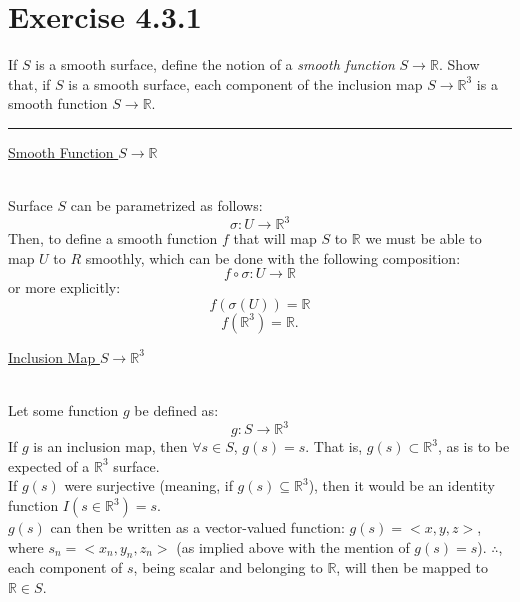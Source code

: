 \documentclass[12pt]{article}
\newcommand{\ulind}[1]
{
\noindent
\underline{#1}\\\\
\indent
}
\newcommand{\R}
{
\mathbb{R}
}
\begin{document}
\maketitle

\section*{Exercise 4.3.1}
\indent

If $S$ is a smooth surface, define the notion of a \emph{smooth function} $S\rightarrow\R$. Show that, if $S$ is a smooth surface, each component of the inclusion map $S\rightarrow\R^3$ is a smooth function $S\rightarrow\R$.

\vspace{1cm}
\hrule
\vspace{1cm}
\noindent

\ulind{Smooth Function $S\rightarrow\R$}
Surface $S$ can be parametrized as follows:
$$
\sigma : U \rightarrow \R^3
$$
Then, to define a smooth function $f$ that will map $S$ to $\R$ we must be able to map $U$ to $R$ smoothly, which can be done with the following composition:
$$
f \circ \sigma : U \rightarrow \R
$$
or more explicitly:
$$
f(\sigma(U)) = \R
$$
$$
f(\R^3) = \R.
$$

\ulind{Inclusion Map $S\rightarrow\R^3$}
Let some function $g$ be defined as:
$$
g: S \rightarrow \R^3
$$
\indent
If $g$ is an inclusion map, then $\forall s \in S$, $g(s) = s$. That is, $g(s) \subset \R^3$, as is to be expected of a $\R^3$ surface. \\
\indent
If $g(s)$ were surjective (meaning, if $g(s) \subseteq \R^3$), then it would be an identity function $I(s \in \R^3) = s$.\\
\indent
$g(s)$ can then be written as a vector-valued function: $g(s) = <x, y, z>$, \\where $s_n = <x_n,y_n,z_n>$ (as implied above with the mention of $g(s) = s$). $\therefore$, each component of $s$, being scalar and belonging to $\R$, will then be mapped to $\R \in S$.
\end{document}
